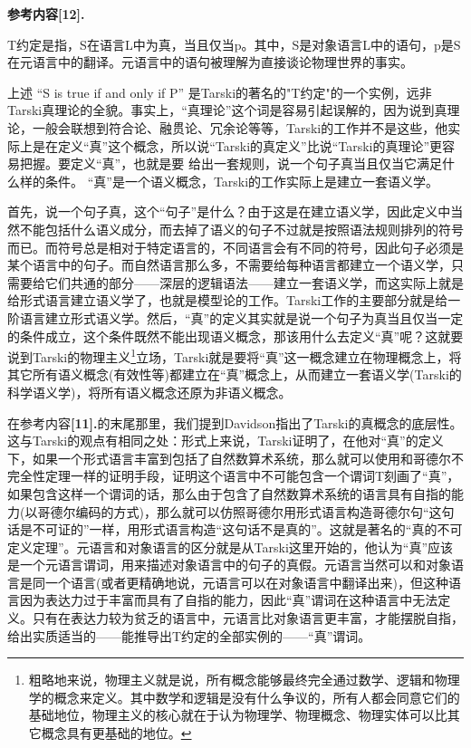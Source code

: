\documentclass{article}
\begin{document}
\textbf{\kaishu 参考内容[12].}
{
T约定是指，S在语言L中为真，当且仅当p。其中，S是对象语言L中的语句，p是S在元语言中的翻译。元语言中的语句被理解为直接谈论物理世界的事实。

上述 “S is true if and only if P” 是Tarski的著名的"T约定"的一个实例，远非Tarski真理论的全貌。事实上，“真理论”这个词是容易引起误解的，因为说到真理论，一般会联想到符合论、融贯论、冗余论等等，Tarski的工作并不是这些，他实际上是在定义“真”这个概念，所以说“Tarski的真定义”比说“Tarski的真理论”更容易把握。要定义“真”，也就是要 给出一套规则，说一个句子真当且仅当它满足什么样的条件。 “真”是一个语义概念，Tarski的工作实际上是建立一套语义学。

首先，说一个句子真，这个“句子”是什么？由于这是在建立语义学，因此定义中当然不能包括什么语义成分，而去掉了语义的句子不过就是按照语法规则排列的符号而已。而符号总是相对于特定语言的，不同语言会有不同的符号，因此句子必须是某个语言中的句子。而自然语言那么多，不需要给每种语言都建立一个语义学，只需要给它们共通的部分——深层的逻辑语法——建立一套语义学，而这实际上就是给形式语言建立语义学了，也就是模型论的工作。Tarski工作的主要部分就是给一阶语言建立形式语义学。然后，“真”的定义其实就是说一个句子为真当且仅当一定的条件成立，这个条件既然不能出现语义概念，那该用什么去定义“真”呢？这就要说到Tarski的物理主义\footnote{粗略地来说，物理主义就是说，所有概念能够最终完全通过数学、逻辑和物理学的概念来定义。其中数学和逻辑是没有什么争议的，所有人都会同意它们的基础地位，物理主义的核心就在于认为物理学、物理概念、物理实体可以比其它概念具有更基础的地位。}立场，Tarski就是要将“真”这一概念建立在物理概念上，将其它所有语义概念(有效性等)都建立在“真”概念上，从而建立一套语义学(Tarski的科学语义学)，将所有语义概念还原为非语义概念。

在参考内容\textbf{[11].}的末尾那里，我们提到Davidson指出了Tarski的真概念的底层性。这与Tarski的观点有相同之处：形式上来说，Tarski证明了，在他对“真”的定义下，如果一个形式语言丰富到包括了自然数算术系统，那么就可以使用和哥德尔不完全性定理一样的证明手段，证明这个语言中不可能包含一个谓词T刻画了“真”，如果包含这样一个谓词的话，那么由于包含了自然数算术系统的语言具有自指的能力(以哥德尔编码的方式)，那么就可以仿照哥德尔用形式语言构造哥德尔句“这句话是不可证的”一样，用形式语言构造“这句话不是真的”。这就是著名的“真的不可定义定理”。元语言和对象语言的区分就是从Tarski这里开始的，他认为“真”应该是一个元语言谓词，用来描述对象语言中的句子的真假。元语言当然可以和对象语言是同一个语言(或者更精确地说，元语言可以在对象语言中翻译出来)，但这种语言因为表达力过于丰富而具有了自指的能力，因此“真”谓词在这种语言中无法定义。只有在表达力较为贫乏的语言中，元语言比对象语言更丰富，才能摆脱自指，给出实质适当的——能推导出T约定的全部实例的——“真”谓词。

}
\end{document}
